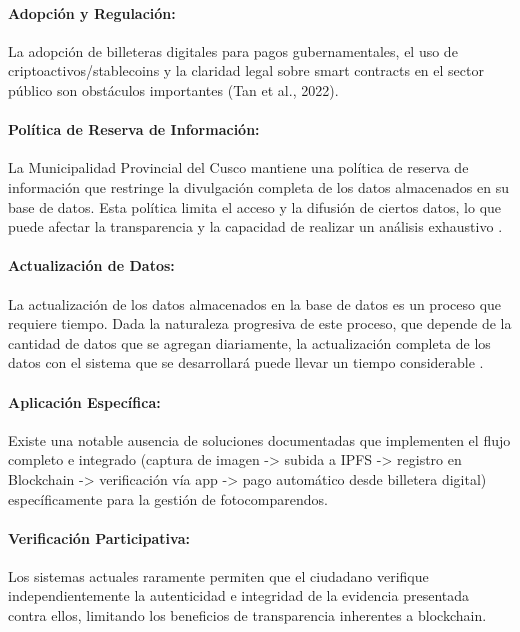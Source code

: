 \paragraph{Adopción y Regulación:}
La adopción de billeteras digitales para pagos gubernamentales, el uso de criptoactivos/stablecoins y la claridad legal sobre smart contracts en el sector público son obstáculos importantes (Tan et al., 2022).

\paragraph{Política de Reserva de Información:}
 La Municipalidad Provincial del Cusco mantiene una política de reserva de información que restringe la divulgación completa de los datos almacenados en su base de datos. Esta política limita el acceso y la difusión de ciertos datos, lo que puede afectar la transparencia y la capacidad de realizar un análisis exhaustivo \parencite{choquevilca2024blockchain}.

\paragraph{Actualización de Datos:}
La actualización de los datos almacenados en la base de datos es un proceso que requiere tiempo. Dada la naturaleza progresiva de este proceso, que depende de la cantidad de datos que se agregan diariamente, la actualización completa de los datos con el sistema que se desarrollará puede llevar un tiempo considerable \parencite{choquevilca2024blockchain}. 

\paragraph{Aplicación Específica:}
Existe una notable ausencia de soluciones documentadas que implementen el flujo completo e integrado (captura de imagen -> subida a IPFS -> registro en Blockchain -> verificación vía app -> pago automático desde billetera digital) específicamente para la gestión de fotocomparendos. \parencite{yousfi2022its, chen2024blockchain}


\paragraph{Verificación Participativa:}
Los sistemas actuales raramente permiten que el ciudadano verifique independientemente la autenticidad e integridad de la evidencia presentada contra ellos, limitando los beneficios de transparencia inherentes a blockchain. 


